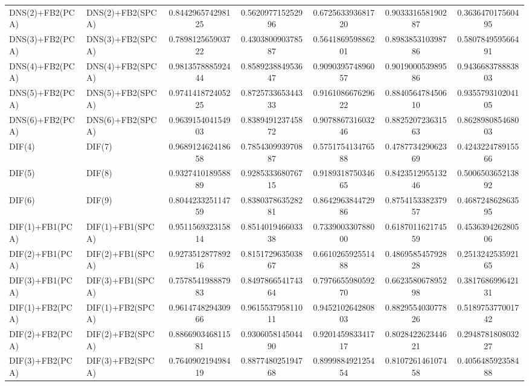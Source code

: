 \begin{table}[H]
\begin{tabular}{llSSSSS}
DNS(2)+FB2(PCA) & DNS(2)+FB2(SPCA) & 0.844296574298125 & 0.562097715252996 & 0.672563393681720 & 0.903331658190287 & 0.363647017560495 \\ 
DNS(3)+FB2(PCA) & DNS(3)+FB2(SPCA) & 0.789812565903722 & 0.430380090378587 & 0.564186959886201 & 0.898385310398786 & 0.580784959566491 \\ 
DNS(4)+FB2(PCA) & DNS(4)+FB2(SPCA) & 0.981357888592444 & 0.858923884953647 & 0.909039574896057 & 0.901900053989586 & 0.943668378883803 \\ 
DNS(5)+FB2(PCA) & DNS(5)+FB2(SPCA) & 0.974141872405225 & 0.872573365344333 & 0.916108667629622 & 0.884056478450610 & 0.935579310204105 \\ 
DNS(6)+FB2(PCA) & DNS(6)+FB2(SPCA) & 0.963915404154903 & 0.838949123745872 & 0.907886731603246 & 0.882520723631563 & 0.862898085468003 \\ 
DIF(4) & DIF(7) & 0.968912462418658 & 0.785430993970887 & 0.575175413476588 & 0.478773429062369 & 0.424322478915566 \\ 
DIF(5) & DIF(8) & 0.932741018958889 & 0.928533368076715 & 0.918931875034665 & 0.842351295513246 & 0.500650365213892 \\ 
DIF(6) & DIF(9) & 0.804423325114759 & 0.838037863528281 & 0.864296384472986 & 0.875415338237957 & 0.468724862863595 \\ 
DIF(1)+FB1(PCA) & DIF(1)+FB1(SPCA) & 0.951156932315814 & 0.851401946603338 & 0.733900330788000 & 0.618701162174559 & 0.453639426280506 \\ 
DIF(2)+FB1(PCA) & DIF(2)+FB1(SPCA) & 0.927351287789216 & 0.815172963503867 & 0.661026592551488 & 0.486958545792828 & 0.251324253592165 \\ 
DIF(3)+FB1(PCA) & DIF(3)+FB1(SPCA) & 0.757854198887983 & 0.849786654174364 & 0.797665598059270 & 0.662358067895298 & 0.381768699642131 \\ 
DIF(1)+FB2(PCA) & DIF(1)+FB2(SPCA) & 0.961474829430966 & 0.961553795811011 & 0.945210264280803 & 0.882955403077826 & 0.518975377001742 \\ 
DIF(2)+FB2(PCA) & DIF(2)+FB2(SPCA) & 0.886690346811581 & 0.930605814504490 & 0.920145983341717 & 0.802842262344621 & 0.294878180803227 \\ 
DIF(3)+FB2(PCA) & DIF(3)+FB2(SPCA) & 0.764090219498419 & 0.887748025194768 & 0.899988492125454 & 0.810726146107458 & 0.405648592358488 \\ \bottomrule 
\end{tabular}
\end{table}



